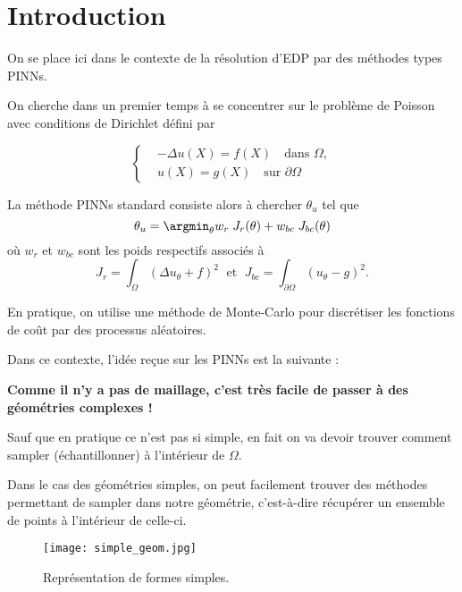 \section{Introduction} \label{levelset_intro}

On se place ici dans le contexte de la résolution d'EDP par des méthodes types PINNs. 

On cherche dans un premier temps à se concentrer sur le problème de Poisson avec conditions de Dirichlet défini par

\begin{equation*}
	\left\{\begin{aligned}
		&-\Delta u(X) = f(X) \quad \text{dans } \Omega, \\
		&u(X) = g(X) \quad \text{sur } \partial \Omega
	\end{aligned}\right.
\end{equation*}

La méthode PINNs standard consiste alors à chercher $\theta_u$ tel que
\begin{equation*}
	\theta_u = \argmin_{\theta} w_{r}\; J_{r}(\theta)+w_{bc}\; J_{bc}(\theta)
\end{equation*}
où $w_{r}$ et $w_{bc}$ sont les poids respectifs associés à
\begin{equation*}
	J_{r} = \int_\Omega (\Delta u_\theta+f)^2 \; \text{ et } \; J_{bc} = \int_{\partial\Omega} (u_\theta-g)^2.
\end{equation*}	

\begin{Rem}
	En pratique, on utilise une méthode de Monte-Carlo pour discrétiser les fonctions de coût par des processus aléatoires.
\end{Rem}

Dans ce contexte, l'idée reçue sur les PINNs est la suivante : 

\begin{center}
	\textbf{Comme il n'y a pas de maillage, c'est très facile de passer à des géométries complexes !}
\end{center}

Sauf que en pratique ce n'est pas si simple, en fait on va devoir trouver comment sampler (échantillonner) à l'intérieur de $\Omega$.

Dans le cas des géométries simples, on peut facilement trouver des méthodes permettant de sampler dans notre géométrie, c'est-à-dire récupérer un ensemble de points à l'intérieur de celle-ci.

\begin{figure}[H]
	\centering
	\texttt{[image: simple\_geom.jpg]}
	\caption{Représentation de formes simples.}
\end{figure}

